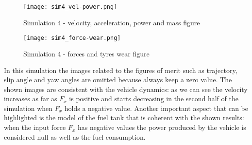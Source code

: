 \documentclass{report}
\begin{document}
\begin{figure}[h!]
    \centering
    \texttt{[image: sim4\_vel-power.png]}
    \caption{Simulation 4 - velocity, acceleration, power and mass figure}
    \label{fig:sim4_1}
\end{figure}

\begin{figure}[h!]
    \centering
    \texttt{[image: sim4\_force-wear.png]}
    \caption{Simulation 4 - forces and tyres wear figure}
    \label{fig:sim4_2}
\end{figure}

In this simulation the images related to the figures of merit such as trajectory, slip angle and yaw angles are omitted because always keep a zero value. The shown images are consistent with the vehicle dynamics: as we can see the velocity increases as far as $F_x$ is positive and starts decreasing in the second half of the simulation when $F_x$ holds a negative value. Another important aspect that can be highlighted is the model of the fuel tank that is coherent with the shown results: when the input force $F_x$ has negative values the power produced by the vehicle is considered null as well as the fuel consumption.\\
\end{document}

